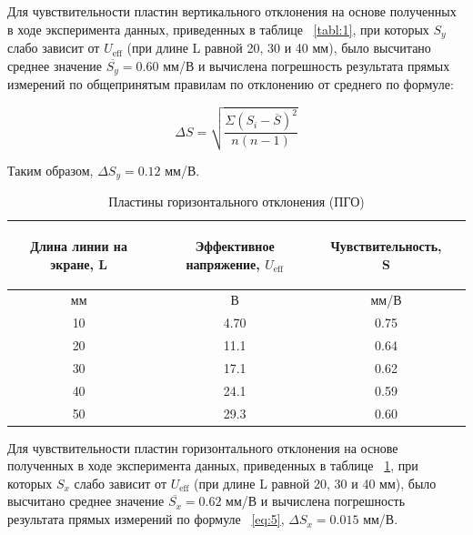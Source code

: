 Для чувствительности пластин вертикального отклонения на основе полученных в ходе эксперимента данных, приведенных в таблице ~\ref{tabl:1}, при которых $S_y$ слабо зависит от $U_{\text{eff}}$ (при длине L равной 20, 30 и 40 мм), было высчитано среднее значение $\overline{S_y} = 0.60$ мм/В и вычислена погрешность результата прямых измерений по общепринятым правилам по отклонению от среднего по формуле:

\begin{equation}
\label{eq:5}
   \Delta S=\sqrt{\frac{\Sigma{(S_i-\overline{S})^2}}{n(n-1)}}
\end{equation}

Таким образом, $\Delta S_y = 0.12$ мм/В.

\begin{center}
\begin{table}[H]
\centering
\caption{Пластины горизонтального отклонения (ПГО)}
\label{tabl:2}
\begin{tabular}{|c|c|c|c|}
\hline
\begin{minipage}{5cm}
\begin{center}
    Длина линии на экране, L
\end{center}
\end{minipage} &
\begin{minipage}{5cm}
\begin{center}
    Эффективное напряжение, $U_{\text{eff}}$
\end{center}
\end{minipage} &
\begin{minipage}{5cm}
\begin{center}
    Чувствительность, S
\end{center}
\end{minipage}\\
\hline
мм&В&мм/В\\
\hline
10  &  4.70  &  0.75 \\
20  &  11.1  &  0.64 \\
30  &  17.1  &  0.62 \\
40  &  24.1  &  0.59 \\
50  &  29.3  &  0.60 \\
\hline
\end{tabular}
\end{table}
\end{center}

Для чувствительности пластин горизонтального отклонения на основе полученных в ходе эксперимента данных, приведенных в таблице ~\ref{tabl:2}, при которых $S_x$ слабо зависит от $U_{\text{eff}}$ (при длине L равной 20, 30 и 40 мм), было высчитано среднее значение $\overline{S_x} = 0.62$ мм/В и вычислена погрешность результата прямых измерений по формуле ~\ref{eq:5}, $\Delta S_x = 0.015$ мм/В.

